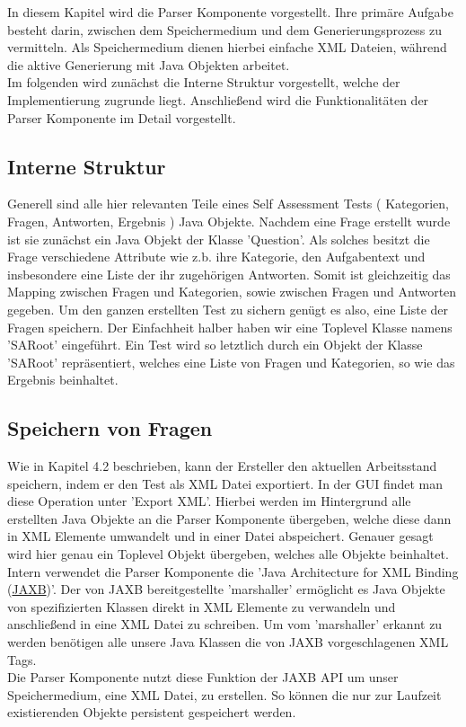 \label{Tim}
In diesem Kapitel wird die Parser Komponente vorgestellt. Ihre primäre Aufgabe besteht darin, zwischen dem Speichermedium und dem Generierungsprozess zu vermitteln. Als Speichermedium dienen hierbei einfache XML Dateien, während die aktive Generierung mit Java Objekten arbeitet.\\
Im folgenden wird zunächst die Interne Struktur vorgestellt, welche der Implementierung zugrunde liegt. Anschließend wird die Funktionalitäten der Parser Komponente im Detail vorgestellt. 

\subsection{Interne Struktur}
Generell sind alle hier relevanten Teile eines Self Assessment Tests ( Kategorien, Fragen, Antworten, Ergebnis ) Java Objekte. 
Nachdem eine Frage erstellt wurde ist sie zunächst ein Java Objekt der Klasse 'Question'. Als solches besitzt die Frage verschiedene Attribute wie z.b. ihre Kategorie, den Aufgabentext und insbesondere eine Liste der ihr zugehörigen Antworten. Somit ist gleichzeitig das Mapping zwischen Fragen und Kategorien, sowie zwischen Fragen und Antworten gegeben. Um den ganzen erstellten Test zu sichern genügt es also, eine Liste der Fragen speichern. Der Einfachheit halber haben wir eine Toplevel Klasse namens 'SARoot' eingeführt. Ein Test wird so letztlich durch ein Objekt der Klasse 'SARoot' repräsentiert, welches eine Liste von Fragen und Kategorien, so wie das Ergebnis beinhaltet.   

\subsection{Speichern von Fragen}
Wie in Kapitel 4.2 beschrieben, kann der Ersteller den aktuellen Arbeitsstand speichern, indem er den Test als XML Datei exportiert. In der GUI findet man diese Operation unter 'Export XML'.
Hierbei werden im Hintergrund alle erstellten Java Objekte an die Parser Komponente übergeben, welche diese dann in XML Elemente umwandelt und in einer Datei abspeichert. Genauer gesagt wird hier genau ein Toplevel Objekt übergeben, welches alle Objekte beinhaltet.\\
Intern verwendet die Parser Komponente die 'Java Architecture for XML Binding (\href{https://javaee.github.io/jaxb-v2/}{JAXB})'. Der von JAXB bereitgestellte 'marshaller' ermöglicht es Java Objekte von spezifizierten Klassen direkt in XML Elemente zu verwandeln und anschließend in eine XML Datei zu schreiben. Um vom 'marshaller' erkannt zu werden benötigen alle unsere Java Klassen die von JAXB vorgeschlagenen XML Tags.\\
Die Parser Komponente nutzt diese Funktion der JAXB API um unser Speichermedium, eine XML Datei, zu erstellen. So können die nur zur Laufzeit existierenden Objekte persistent gespeichert werden.

